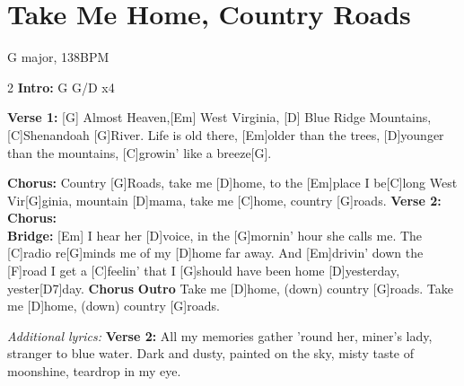 \documentclass[a5paper]{article}
\begin{document}
\section{Take Me Home, Country Roads}
{\tiny
G major, 138BPM
}
\small
\begin{guitar}
\begin{multicols}{2}
\textbf{Intro:}
G  G/D  x4
 
\textbf{Verse 1:}
[G]  Almost Heaven,[Em] West Virginia,
[D] Blue Ridge Mountains, [C]Shenandoah [G]River.
Life is old there, [Em]older than the trees,
[D]younger than the mountains,
[C]growin' like a breeze[G].
 
\textbf{Chorus:}
Country [G]Roads, take me [D]home, to the
[Em]place I be[C]long West Vir[G]ginia,
mountain [D]mama, take me [C]home,
country [G]roads.
\textbf{Verse 2:}\\
\textbf{Chorus:}\\
\textbf{Bridge:}
[Em] I hear her [D]voice, in the [G]mornin' hour she calls me.
The [C]radio re[G]minds me of my [D]home far away.
And [Em]drivin' down the [F]road I get a [C]feelin' that I [G]should have been home [D]yesterday, yester[D7]day.
\textbf{Chorus}%
\textbf{Outro}
Take me [D]home, (down) country [G]roads.
Take me [D]home, (down) country [G]roads.
\end{multicols}
\vspace{-3em}
\begin{center}
\textit{Additional lyrics:}
\textbf{Verse 2:}
All my memories  gather 'round her,
miner's lady, stranger to blue water.
Dark and dusty, painted on the sky,
misty taste of moonshine,
teardrop in my eye.
\end{center}

\end{guitar}
\end{document}
